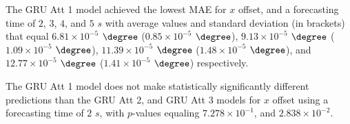 \begin{table}[!ht]
	\centering
	\caption{The average MAE in $\degree$ ($\times 10^{-5}$), with standard deviation in brackets, across $k$-fold validation datasets for the $x$ offset estimated on the $k$-fold testing datasets by different RNN models, and forecasting times.}
	\label{tab:best_longitude_no_abs_MAE}
\end{table}

The GRU Att 1 model achieved the lowest MAE for $x$ offset, and a forecasting time of $2$, $3$, $4$, and $5$ $s$ with average values and standard deviation (in brackets) that equal $6.81 \times 10^{-5}$ $\degree$ ($0.85 \times 10^{-5}$ $\degree$), $9.13 \times 10^{-5}$ $\degree$ ($1.09 \times 10^{-5}$ $\degree$), $11.39 \times 10^{-5}$ $\degree$ ($1.48 \times 10^{-5}$ $\degree$), and $12.77 \times 10^{-5}$ $\degree$ ($1.41 \times 10^{-5}$ $\degree$) respectively.

The GRU Att 1 model does not make statistically significantly different predictions than the GRU Att 2, and GRU Att 3 models for $x$ offset using a forecasting time of $2$ $s$, with $p$-values equaling $7.278 \times 10^{-1}$, and $2.838 \times 10^{-2}$.

